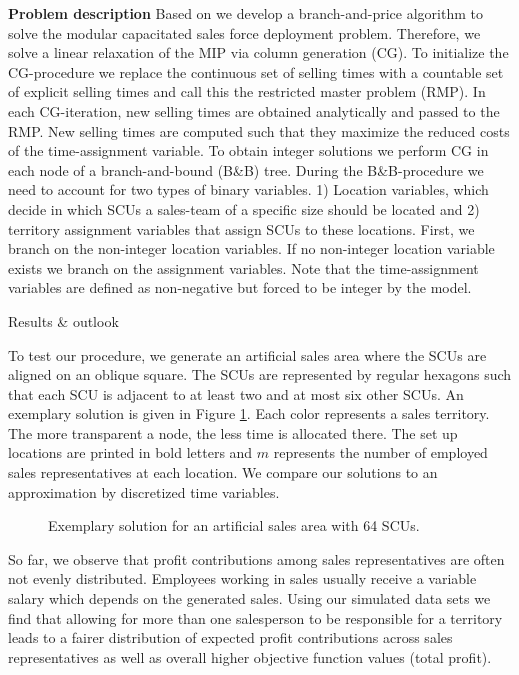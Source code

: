 \documentclass[12pt]{scrartcl}
\begin{document}
\begin{section}{\textbf{Problem description}}
Based on \cite{Haase2014} we develop a branch-and-price algorithm to solve the modular capacitated sales force deployment problem. Therefore, we solve a linear relaxation of the MIP via column generation (CG). To initialize the CG-procedure we replace the continuous set of selling times with a countable set of explicit selling times and call this the restricted master problem (RMP). In each CG-iteration, new selling times are obtained analytically and passed to the RMP. New selling times are computed such that they maximize the reduced costs of the time-assignment variable. To obtain integer solutions we perform CG in each node of a branch-and-bound (B\&B) tree. During the B\&B-procedure we need to account for two types of binary variables. 1) Location variables, which decide in which SCUs a sales-team of a specific size should be located and 2) territory assignment variables that assign SCUs to these locations. First, we branch on the non-integer location variables. If no non-integer location variable exists we branch on the assignment variables. Note that the time-assignment variables are defined as non-negative but forced to be integer by the model.
\end{section}

\begin{section}{Results \& outlook}



To test our procedure, we generate an artificial sales area where the SCUs are aligned on an oblique square. The SCUs are represented by regular hexagons such that each SCU is adjacent to at least two and at most six other SCUs. An exemplary solution is given in Figure \ref{fig:sales_area}. Each color represents a sales territory. The more transparent a node, the less time is allocated there. The set up locations are printed in bold letters and $m$ represents the number of employed sales representatives at each location. We compare our solutions to an approximation by discretized time variables.

\begin{figure}[h!]
    \centering
    
    \caption{Exemplary solution for an artificial sales area with 64 SCUs. }
    \label{fig:sales_area}
\end{figure}

So far, we observe that profit contributions among sales representatives are often not evenly distributed. Employees working in sales usually receive a variable salary which depends on the generated sales. Using our simulated data sets we find that allowing for more than one salesperson to be responsible for a territory leads to a fairer distribution of expected profit contributions across sales representatives as well as overall higher objective function values (total profit).



\end{section}


\end{document}
